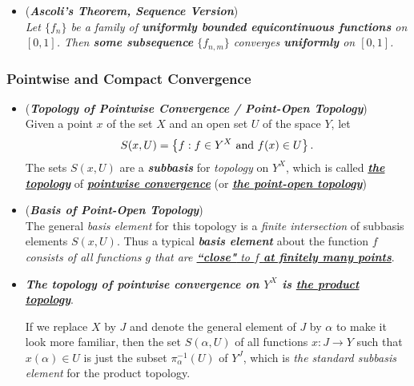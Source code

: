 \documentclass[11pt]{article}
\begin{document}
\begin{itemize}
\item \begin{remark} (\textbf{\emph{Ascoli's Theorem, Sequence Version}}) \citep{reed1980methods}\\
\emph{Let $\{f_n\}$ be a family of \textbf{uniformly bounded equicontinuous functions} on $[0, 1]$. Then \textbf{some subsequence} $\{f_{n,m}\}$ converges \textbf{uniformly} on $[0, 1]$.}
\end{remark}
\end{itemize}

\subsubsection{Pointwise and Compact Convergence}
\begin{itemize}
\item \begin{definition} (\emph{\textbf{Topology of Pointwise Convergence / Point-Open Topology}})\\
Given a point $x$ of the set $X$ and an open set $U$ of the space $Y$, let
\begin{align*}
S(x, U) = \left\{f:  f \in Y^X\text{ and }f(x) \in U\right\}.
\end{align*}
The sets $S(x, U)$ are a \emph{\textbf{subbasis}} for \emph{topology} on $Y^X$, which is called \underline{\emph{\textbf{the topology}}} of \underline{\emph{\textbf{pointwise convergence}}} (or \underline{\emph{\textbf{the point-open topology}}})
\end{definition}



\item \begin{remark} (\emph{\textbf{Basis of Point-Open Topology}})\\
The general \emph{basis element} for this topology is a \emph{finite intersection} of subbasis elements $S(x, U)$. Thus a typical \emph{\textbf{basis element}} about the function $f$ \emph{consists of all functions $g$ that are \underline{\textbf{``close"} to $f$ \textbf{at finitely many points}}}. 
\end{remark}

\item \begin{remark}
\emph{\textbf{The topology of pointwise convergence on $Y^X$ is \underline{the product topology}}}. 

If we replace $X$ by $J$ and denote the general element of $J$ by $\alpha$ to make it look more familiar, then the set $S(\alpha, U)$ of all functions $x : J \rightarrow Y$
such that $x(\alpha) \in U$ is just the subset $\pi_{\alpha}^{-1}(U)$ of $Y^J$, which is \emph{the standard subbasis element} for the product topology.
\end{remark}


\end{itemize}
\end{document}
